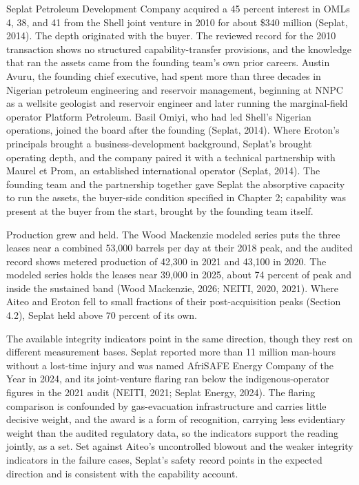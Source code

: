 \documentclass[twoside,fontset=lmodern]{mitthesis}
\begin{document}
Seplat Petroleum Development Company acquired a 45 percent interest in
OMLs 4, 38, and 41 from the Shell joint venture in 2010 for about \$340
million (Seplat, 2014). The depth originated with the buyer. The
reviewed record for the 2010 transaction shows no structured
capability-transfer provisions, and the knowledge that ran the assets
came from the founding team's own prior careers. Austin Avuru, the
founding chief executive, had spent more than three decades in Nigerian
petroleum engineering and reservoir management, beginning at NNPC as a
wellsite geologist and reservoir engineer and later running the
marginal-field operator Platform Petroleum. Basil Omiyi, who had led
Shell's Nigerian operations, joined the board after the founding
(Seplat, 2014). Where Eroton's principals brought a business-development
background, Seplat's brought operating depth, and the company paired it
with a technical partnership with Maurel et Prom, an established
international operator (Seplat, 2014). The founding team and the
partnership together gave Seplat the absorptive capacity to run the
assets, the buyer-side condition specified in Chapter 2; capability was
present at the buyer from the start, brought by the founding team
itself.

Production grew and held. The Wood Mackenzie modeled series puts the
three leases near a combined 53,000 barrels per day at their 2018 peak,
and the audited record shows metered production of 42,300 in 2021 and
43,100 in 2020. The modeled series holds the leases near 39,000 in 2025,
about 74 percent of peak and inside the sustained band (Wood Mackenzie,
2026; NEITI, 2020, 2021). Where Aiteo and Eroton fell to small fractions
of their post-acquisition peaks (Section 4.2), Seplat held above 70
percent of its own.

The available integrity indicators point in the same direction, though
they rest on different measurement bases. Seplat reported more than 11
million man-hours without a lost-time injury and was named AfriSAFE
Energy Company of the Year in 2024, and its joint-venture flaring ran
below the indigenous-operator figures in the 2021 audit (NEITI, 2021;
Seplat Energy, 2024). The flaring comparison is confounded by
gas-evacuation infrastructure and carries little decisive weight, and
the award is a form of recognition, carrying less evidentiary weight
than the audited regulatory data, so the indicators support the reading
jointly, as a set. Set against Aiteo's uncontrolled blowout and the
weaker integrity indicators in the failure cases, Seplat's safety record
points in the expected direction and is consistent with the capability
account.
\end{document}

